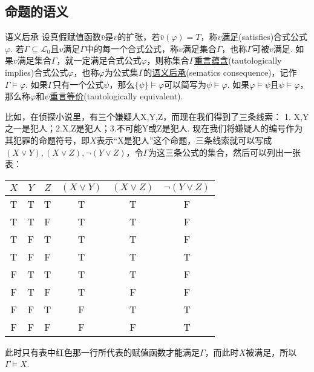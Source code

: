 \documentclass[main.tex]{subfiles}
\begin{document}
\subsection{命题的语义}

\begin{definition}{语义后承}
    设真假赋值函数\(\bar v\)是\(v\)的扩张，若\(\bar v(\varphi) = T\)，称\(v\)\uline{满足}(satisfies)合式公式\(\varphi\). \newline
    若\(\Gamma \subseteq \mathcal{L}_0\)且\(v\)满足\(\Gamma\)中的每一个合式公式，称\(v\)满足集合\(\Gamma\)，也称\(\Gamma\)可被\(v\)满足. \newline
    如果\(v\)满足集合\(\Gamma\)，就一定满足合式公式\(\varphi\)，则称集合\(\Gamma\)\uline{重言蕴含}(tautologically implies)合式公式\(\varphi\)，也称\(\varphi\)为公式集\(\Gamma\)的\uline{语义后承}(sematics consequence)，记作\(\Gamma \vDash \varphi\). \newline
    如果\(\Gamma\)只有一个公式\(\psi\)，那么\(\{\psi\} \vDash \varphi\)可以简写为\(\psi \vDash \varphi\). 如果\(\varphi \vDash \psi\)且\(\psi \vDash \varphi\)，那么称\(\varphi\)和\(\psi\)\uline{重言等价}(tautologically equivalent).
\end{definition}

\begin{note}
    比如，在侦探小说里，有三个嫌疑人X,Y,Z，而现在我们得到了三条线索：
    1. X,Y之一是犯人；2.X,Z是犯人；3.不可能Y或Z是犯人. 现在我们将嫌疑人的编号作为其犯罪的命题符号，即\(X\)表示“X是犯人”这个命题，三条线索就可以写成\((X \vee Y), (X \vee Z), \neg(Y \vee Z)\)，令\(\Gamma\)为这三条公式的集合，然后可以列出一张表：
    \begin{table}[hbtp]
        \begin{center}
            \begin{tabular}{ccc|ccc}
                \hline
                \(X\) & \(Y\) & \(Z\) & \((X \vee Y)\) & \((X \vee Z)\) & \(\neg(Y \vee Z)\) \\
                \hline
                T & T & T & T & T & F \\
                T & T & F & T & T & F \\
                T & F & T & T & T & F \\
                {\color{red}T} & {\color{red}F} & {\color{red}F} & {\color{red}T} & {\color{red}T} & {\color{red}T} \\
                F & T & T & T & T & F \\
                F & T & F & T & F & F \\
                F & F & T & F & T & T \\
                F & F & F & F & F & T \\
                \hline
            \end{tabular}
        \end{center}
    \end{table}
    此时只有表中红色那一行所代表的赋值函数才能满足\(\Gamma\)，而此时\(X\)被满足，所以\(\Gamma \vDash X\). 
\end{note}
\end{document}

